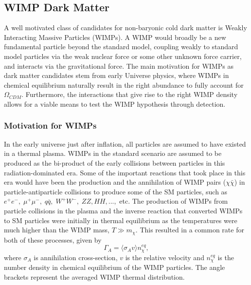 \subsection{WIMP Dark Matter}
\label{subsec:wimp_dm}

A well motivated class of candidates for non-baryonic cold dark matter is Weakly Interacting Massive Particles (WIMPs). A WIMP would broadly be a new fundamental particle beyond the standard model, coupling weakly to standard model particles via the weak nuclear force or some other unknown force carrier, and interacts via the gravitational force. The main motivation for WIMPs as dark matter candidates stem from early Universe physics, where WIMPs in chemical equilibrium naturally result in the right abundance to fully account for $\Omega_{CDM}$. Furthermore, the interactions that give rise to the right WIMP density allows for a viable means to test the WIMP hypothesis through detection.

\subsubsection{Motivation for WIMPs}
\label{subsubsec:motivation_wimps}

In the early universe just after inflation, all particles are assumed to have existed in a thermal plasma. WIMPs in the standard scenario are assumed to be produced as the bi-product of the early collisions between particles in this radiation-dominated era. Some of the important reactions that took place in this era would have been the production and the annihilation of WIMP pairs ($\chi{}\bar{\chi}$) in particle-antiparticle collisions to produce some of the SM particles, such as $e^{+}e^{-}, \; \mu^{+}\mu^{-}, \; q\bar{q}, \; W^{+}W^{-}, \; ZZ, HH,...,$ etc. The production of WIMPs from particle collisions in the plasma and the inverse reaction that converted WIMPs to SM particles were initially in thermal equilibrium as the temperatures were much higher than the WIMP mass, $T \gg m_{\chi}$. This resulted in a common rate for both of these processes, given by
%
\begin{equation}
    \Gamma_{A} = \langle \sigma_{A}v \rangle n^{eq}_{\chi}, 
\end{equation}
%
where $\sigma_{A}$ is annihilation cross-section, $v$ is the relative velocity and $n_{\chi}^{eq}$ is the number density in chemical equilibrium of the WIMP particles. The angle brackets represent the averaged WIMP thermal distribution. 


